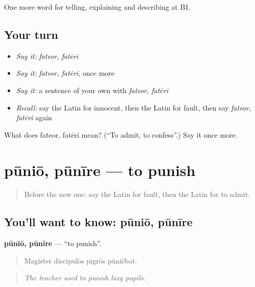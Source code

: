 \begin{grammarlens}[title={What you've built}]
One more word for telling, explaining and describing at B1.
\end{grammarlens}

\subsection*{Your turn}
\begin{itemize}
\raggedright
  \item \emph{Say it:} \emph{fateor, fatērī}
  \item \emph{Say it:} \emph{fateor, fatērī}, once more
  \item \emph{Say it:} a sentence of your own with \emph{fateor, fatērī}
  \item \emph{Recall:} say the Latin for innocent, then the Latin for fault, then say \emph{fateor, fatērī} again
\end{itemize}

\begin{tcolorbox}[breakable,colback=teal!4,colframe=teal!35!black,title={Before you move on}]
What does fateor, fatērī mean? (\textquotedblleft{}To admit, to confess\textquotedblright{}.) Say it once more.
\end{tcolorbox}
\section[pūniō, pūnīre]{pūniō, pūnīre — to punish}

\label{lesson:LA-C312-punio}



\begin{quote}
Before the new one: say the Latin for fault, then the Latin for to admit.
\end{quote}

\subsection*{You'll want to know: pūniō, pūnīre}
\textbf{pūniō, pūnīre} — \textquotedblleft{}to punish\textquotedblright{}.

\begin{quote}
Magister discipulōs pigrōs pūniēbat.
\end{quote}

\begin{quote}
\emph{The teacher used to punish lazy pupils.}
\end{quote}

